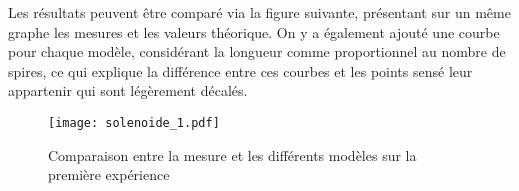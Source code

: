 \begin{table}[H]
\centering
{}

\caption{Mesures et calculs de la première expérience}
\end{table}

Les résultats peuvent être comparé via la figure suivante, présentant sur un même graphe les mesures et les valeurs théorique. On y a également ajouté une courbe pour chaque modèle, considérant la longueur comme proportionnel au nombre de spires, ce qui explique la différence entre ces courbes et les points sensé leur appartenir qui sont légèrement décalés.

\begin{figure}[H]
\centering
\texttt{[image: solenoide\_1.pdf]}

\caption{Comparaison entre la mesure et les différents modèles sur la première expérience}
\end{figure}


